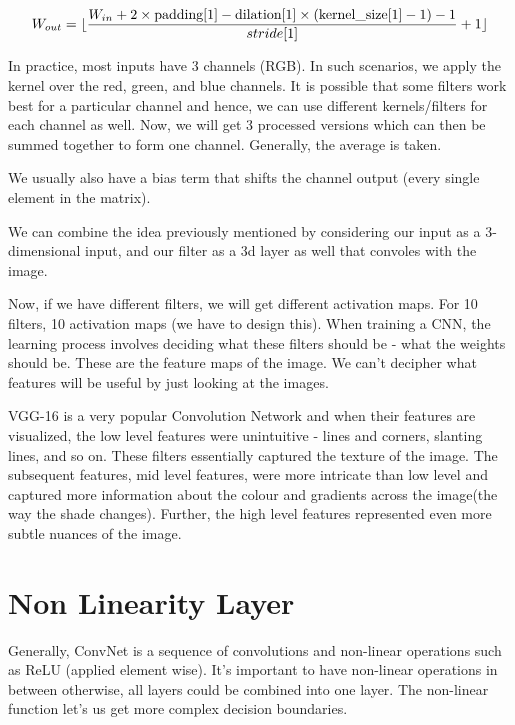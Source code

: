 \begin{align}
    W_{out} = \lfloor\frac{W_{in} + 2\times \text{padding}[1] - \text{dilation}[1]\times (\text{kernel\_size}[1] - 1) - 1}{stride[1]} + 1\rfloor
\end{align}

In practice, most inputs have 3 channels (RGB). In such scenarios, we apply the kernel over the red, green, and blue channels. It is possible that some filters work best for a particular channel and hence, we can use different kernels/filters for each channel as well. Now, we will get 3 processed versions which can then be summed together to form one channel. Generally, the average is taken. 

We usually also have a bias term that shifts the channel output (every single element in the matrix). 

We can combine the idea previously mentioned by considering our input as a 3-dimensional input, and our filter as a 3d layer as well that convoles with the image. 

Now, if we have different filters, we will get different activation maps. For 10 filters, 10 activation maps (we have to design this). When training a CNN, the learning process involves deciding what these filters should be - what the weights should be. These are the feature maps of the image. We can't decipher what features will be useful by just looking at the images.

VGG-16 is a very popular Convolution Network and when their features are visualized, the low level features were unintuitive - lines and corners, slanting lines, and so on. These filters essentially captured the texture of the image. 
The subsequent features, mid level features, were more intricate than low level and captured more information about the colour and gradients across the image(the way the shade changes). Further, the high level features represented even more subtle nuances of the image. 

\section{Non Linearity Layer}

Generally, ConvNet is a sequence of convolutions and non-linear operations such as ReLU (applied element wise). It's important to have non-linear operations in between otherwise, all layers could be combined into one layer. The non-linear function let's us get more complex decision boundaries. 

